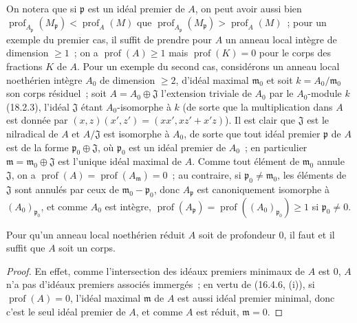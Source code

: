\begin{env}[16.4.6.4]
\label{0.16.4.6.4-fr}
On notera que si $\mathfrak{p}$ est un idéal premier de $A$, on peut avoir
aussi bien
$\operatorname{prof}_{A_{\mathfrak{p}}}(M_{\mathfrak{p}})
<\operatorname{prof}_A(M)$ que
$\operatorname{prof}_{A_{\mathfrak{p}}}(M_{\mathfrak{p}})
>\operatorname{prof}_A(M)$~; pour un exemple du premier cas,
il suffit de prendre pour $A$ un anneau local intègre de dimension $\geq1$~; on a
$\operatorname{prof}(A)\geq1$ mais $\operatorname{prof}(K)=0$ pour le corps
des fractions $K$ de $A$. Pour un exemple du second cas, considérons un
anneau local noethérien intègre $A_0$ de dimension $\geq2$, d'idéal maximal
$\mathfrak{m}_0$ et soit $k=A_0/\mathfrak{m}_0$ son corps résiduel~; soit
$A=A_0\oplus\mathfrak{J}$ l'extension triviale de $A_0$ par le $A_0$-module
$k$ (18.2.3), l'idéal $\mathfrak{J}$ étant $A_0$-isomorphe à $k$ (de sorte
que la multiplication dans $A$ est donnée par
$(x,z)(x',z')=(xx',xz'+x'z)$). Il est clair que $\mathfrak{J}$ est le
nilradical de $A$ et $A/\mathfrak{J}$ est isomorphe à $A_0$, de sorte que
tout idéal premier $\mathfrak{p}$ de $A$ est de la forme
$\mathfrak{p}_0\oplus\mathfrak{J}$, où $\mathfrak{p}_0$ est un idéal premier
de $A_0$~; en particulier $\mathfrak{m}=\mathfrak{m}_0\oplus\mathfrak{J}$
est l'unique idéal maximal de $A$. Comme tout élément de $\mathfrak{m}_0$
annule $\mathfrak{J}$, on a
$\operatorname{prof}(A)=\operatorname{prof}(A_{\mathfrak{m}})=0$~; au
contraire, si $\mathfrak{p}_0\neq\mathfrak{m}_0$, les éléments de
$\mathfrak{J}$ sont annulés par ceux de
$\mathfrak{m}_0-\mathfrak{p}_0$, donc $A_{\mathfrak{p}}$ est canoniquement
isomorphe à $(A_0)_{\mathfrak{p}_0}$, et comme $A_0$ est intègre,
$\operatorname{prof}(A_{\mathfrak{p}})
=\operatorname{prof}((A_0)_{\mathfrak{p}_0})\geq1$ si
$\mathfrak{p}_0\neq0$.
\end{env}

\begin{corollary}[16.4.7]
\label{0.16.4.7-fr}
Pour qu'un anneau local noethérien réduit $A$ soit de profondeur $0$, il faut
et il suffit que $A$ soit un corps.
\end{corollary}

\begin{proof}
En effet, comme l'intersection des idéaux premiers minimaux de $A$ est $0$,
$A$ n'a pas d'idéaux premiers associés immergés~; en vertu de (16.4.6, (i)),
si $\operatorname{prof}(A)=0$, l'idéal maximal $\mathfrak{m}$ de $A$ est
aussi idéal premier minimal, donc c'est le seul idéal premier de $A$, et
comme $A$ est réduit, $\mathfrak{m}=0$.
\end{proof}

